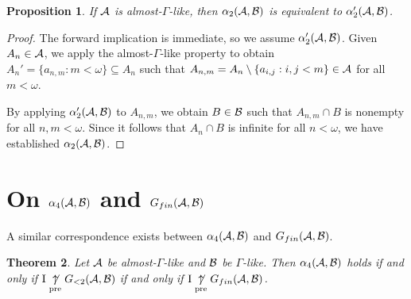 \documentclass{amsart}
\theoremstyle{plain}
\newtheorem{theorem}{Theorem}
\newtheorem{proposition}[theorem]{Proposition}
\theoremstyle{definition}
\theoremstyle{remark}
\theoremstyle{plain}
\theoremstyle{definition}
\theoremstyle{remark}
\begin{document}
\begin{proposition}
If \(\mathcal{A}\) is almost-\(\Gamma\)-like, then
\(\alpha_2(\mathcal{A},\mathcal{B})\) is equivalent to \(\alpha_2'(\mathcal{A},\mathcal{B})\).
\end{proposition}

\begin{proof}
The forward implication is immediate, so we assume \(\alpha_2'(\mathcal{A},\mathcal{B})\).
Given \(A_n\in\mathcal{A}\), we apply the almost-\(\Gamma\)-like property to obtain
\(A_n'=\{a_{n,m}:m<\omega\}\subseteq A_n\) such that
\(A_{n,m}=A_n\setminus\{a_{i,j}:i,j<m\}\in\mathcal{A}\) for all \(m<\omega\).

By applying \(\alpha_2'(\mathcal{A},\mathcal{B})\) to \(A_{n,m}\), we obtain
\(B\in\mathcal{B}\) such that \(A_{n,m}\cap B\) is nonempty for all \(n,m<\omega\).
Since it follows that \(A_n\cap B\) is infinite for all \(n<\omega\),
we have established \(\alpha_2(\mathcal{A},\mathcal{B})\).
\end{proof}

\section{On \(\alpha_4(\mathcal{A},\mathcal{B})\) and \(G_{fin}(\mathcal{A},\mathcal{B})\)}

A similar correspondence exists between \(\alpha_4(\mathcal{A},\mathcal{B})\)
and \(G_{fin}(\mathcal{A},\mathcal{B})\).

\begin{theorem}
Let \(\mathcal{A}\) be almost-\(\Gamma\)-like and \(\mathcal{B}\) be \(\Gamma\)-like. 
Then \(\alpha_4(\mathcal{A},\mathcal{B})\) holds if and only
if \(\mathrm{I}\underset{\text{pre}}{\not\uparrow} G_{<2}(\mathcal{A},\mathcal{B})\) if and only if
\(\mathrm{I}\underset{\text{pre}}{\not\uparrow} G_{fin}(\mathcal{A},\mathcal{B})\).
\end{theorem}
\end{document}
